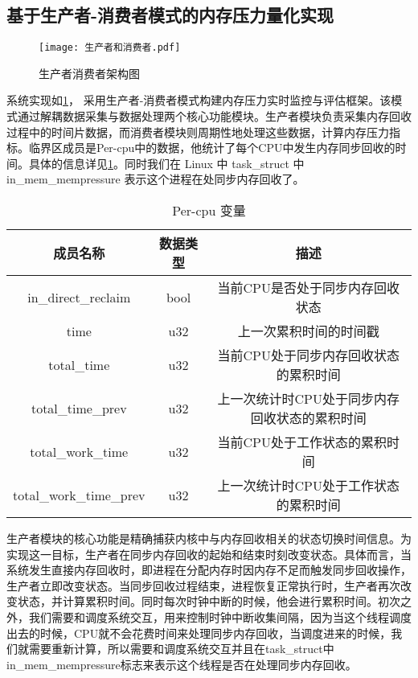 \subsection{基于生产者-消费者模式的内存压力量化实现}

\begin{figure}[H]
    \centering
    \texttt{[image: 生产者和消费者.pdf]}
    \caption{生产者消费者架构图}
    \label{fig:producer-consumer}
\end{figure}

系统实现如\ref{fig:producer-consumer}， 采用生产者-消费者模式构建内存压力实时监控与评估框架。该模式通过解耦数据采集与数据处理两个核心功能模块。生产者模块负责采集内存回收过程中的时间片数据，而消费者模块则周期性地处理这些数据，计算内存压力指标。临界区成员是Per-cpu中的数据，他统计了每个CPU中发生内存同步回收的时间。具体的信息详见\ref{tab:sensor_data}。同时我们在 Linux 中 task\_struct 中 in\_mem\_mempressure 表示这个进程在处同步内存回收了。

\begin{table}[htbp]
    \centering
    \caption{Per-cpu 变量}
    \label{tab:sensor_data}
    \begin{tabular}{ccc}
        \toprule
        成员名称& 数据类型     & 描述                                        \\ \midrule
        in\_direct\_reclaim & bool & 当前CPU是否处于同步内存回收状态\\
        \midrule
        time & u32 & 上一次累积时间的时间戳\\
        \midrule
        total\_time &u32&当前CPU处于同步内存回收状态的累积时间\\
        \midrule
        total\_time\_prev&u32&上一次统计时CPU处于同步内存回收状态的累积时间\\
        \midrule
        total\_work\_time&u32&当前CPU处于工作状态的累积时间\\
        \midrule
        total\_work\_time\_prev&u32&上一次统计时CPU处于工作状态的累积时间\\
        \bottomrule
    \end{tabular}
  \end{table}

生产者模块的核心功能是精确捕获内核中与内存回收相关的状态切换时间信息。为实现这一目标，生产者在同步内存回收的起始和结束时刻改变状态。具体而言，当系统发生直接内存回收时，即进程在分配内存时因内存不足而触发同步回收操作，生产者立即改变状态。当同步回收过程结束，进程恢复正常执行时，生产者再次改变状态，并计算累积时间。同时每次时钟中断的时候，他会进行累积时间。初次之外，我们需要和调度系统交互，用来控制时钟中断收集间隔，因为当这个线程调度出去的时候，CPU就不会花费时间来处理同步内存回收，当调度进来的时候，我们就需要重新计算，所以需要和调度系统交互并且在task\_struct中in\_mem\_mempressure标志来表示这个线程是否在处理同步内存回收。

